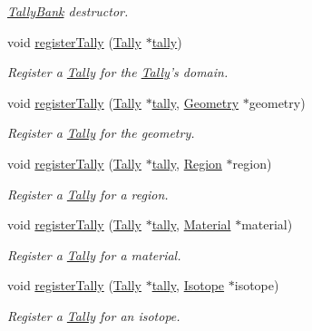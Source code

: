 \begin{DoxyCompactItemize}
\begin{DoxyCompactList}\small\item\em \hyperlink{classTallyBank}{Tally\-Bank} destructor. \end{DoxyCompactList}\item 
void \hyperlink{classTallyBank_a90ee52a423f9957f92c6727f7fe4d549}{register\-Tally} (\hyperlink{classTally}{Tally} $\ast$\hyperlink{classTallyBank_a929908afec2f18a4321b29beb52877f2}{tally})
\begin{DoxyCompactList}\small\item\em Register a \hyperlink{classTally}{Tally} for the \hyperlink{classTally}{Tally}'s domain. \end{DoxyCompactList}\item 
void \hyperlink{classTallyBank_a91534dfefd753e4a5d907edc97eb35d1}{register\-Tally} (\hyperlink{classTally}{Tally} $\ast$\hyperlink{classTallyBank_a929908afec2f18a4321b29beb52877f2}{tally}, \hyperlink{classGeometry}{Geometry} $\ast$geometry)
\begin{DoxyCompactList}\small\item\em Register a \hyperlink{classTally}{Tally} for the geometry. \end{DoxyCompactList}\item 
void \hyperlink{classTallyBank_a796fc4a2a42ea1065743d2bf51b5d69c}{register\-Tally} (\hyperlink{classTally}{Tally} $\ast$\hyperlink{classTallyBank_a929908afec2f18a4321b29beb52877f2}{tally}, \hyperlink{classRegion}{Region} $\ast$region)
\begin{DoxyCompactList}\small\item\em Register a \hyperlink{classTally}{Tally} for a region. \end{DoxyCompactList}\item 
void \hyperlink{classTallyBank_a66e05cdee146e7740b211c6037672226}{register\-Tally} (\hyperlink{classTally}{Tally} $\ast$\hyperlink{classTallyBank_a929908afec2f18a4321b29beb52877f2}{tally}, \hyperlink{classMaterial}{Material} $\ast$material)
\begin{DoxyCompactList}\small\item\em Register a \hyperlink{classTally}{Tally} for a material. \end{DoxyCompactList}\item 
void \hyperlink{classTallyBank_afa78d302d6665bdbe407f2c126f218ce}{register\-Tally} (\hyperlink{classTally}{Tally} $\ast$\hyperlink{classTallyBank_a929908afec2f18a4321b29beb52877f2}{tally}, \hyperlink{classIsotope}{Isotope} $\ast$isotope)
\begin{DoxyCompactList}\small\item\em Register a \hyperlink{classTally}{Tally} for an isotope. \end{DoxyCompactList}\item 

\end{DoxyCompactItemize}
